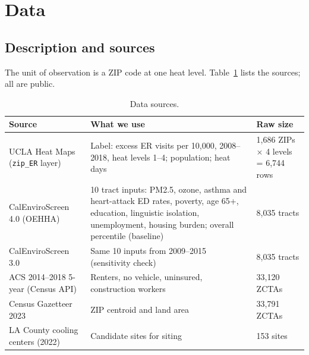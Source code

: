 \documentclass[10pt]{article}
\begin{document}
\section{Data}
\label{sec:data}

\subsection{Description and sources}
The unit of observation is a ZIP code at one heat level. Table~\ref{tab:sources} lists the sources; all are public.

\begin{table}[!htbp]
\centering\small
\caption{Data sources.}
\label{tab:sources}
\begin{tabular}{@{}p{3.1cm}p{5.6cm}p{3.6cm}@{}}
\toprule
Source & What we use & Raw size \\
\midrule
UCLA Heat Maps (\texttt{zip\_ER} layer) & Label: excess ER visits per 10,000, 2008--2018, heat levels 1--4; population; heat days & 1,686 ZIPs $\times$ 4 levels = 6,744 rows \\
CalEnviroScreen 4.0 (OEHHA) & 10 tract inputs: PM2.5, ozone, asthma and heart-attack ED rates, poverty, age 65+, education, linguistic isolation, unemployment, housing burden; overall percentile (baseline) & 8,035 tracts \\
CalEnviroScreen 3.0 & Same 10 inputs from 2009--2015 (sensitivity check) & 8,035 tracts \\
ACS 2014--2018 5-year (Census API) & Renters, no vehicle, uninsured, construction workers & 33,120 ZCTAs \\
Census Gazetteer 2023 & ZIP centroid and land area & 33,791 ZCTAs \\
LA County cooling centers (2022) & Candidate sites for siting & 153 sites \\
\bottomrule
\end{tabular}
\end{table}
\end{document}

